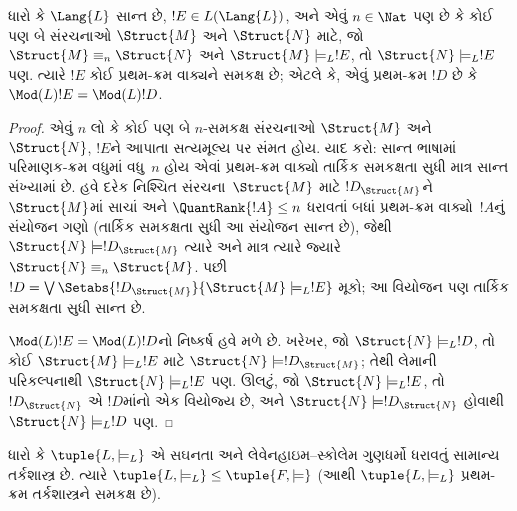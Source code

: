 \label{guunit:OLP-0207}


\begin{lem}
ધારો કે $\Lang{L}$ સાન્ત છે, $!E \in L(\Lang{L})$, અને એવું
$n \in \Nat$ પણ છે કે કોઈ પણ બે સંરચનાઓ $\Struct{M}$ અને
$\Struct{N}$ માટે, જો $\Struct{M} \equiv_n \Struct{N}$ અને
$\Struct{M} \models_L !E$, તો $\Struct{N} \models_L !E$ પણ. ત્યારે
$!E$ કોઈ પ્રથમ-ક્રમ વાક્યને સમકક્ષ છે; એટલે કે, એવું પ્રથમ-ક્રમ
$!D$ છે કે $\Mod(L){!E} = \Mod(L){!D}$.
\end{lem}

\begin{proof}
એવું $n$ લો કે કોઈ પણ બે $n$-સમકક્ષ સંરચનાઓ $\Struct{M}$ અને
$\Struct{N}$, $!E$ને આપાતા સત્યમૂલ્ય પર સંમત હોય.
 યાદ કરો: સાન્ત ભાષામાં
પરિમાણક-ક્રમ વધુમાં વધુ~$n$ હોય એવાં પ્રથમ-ક્રમ વાક્યો તાર્કિક
સમકક્ષતા સુધી માત્ર સાન્ત સંખ્યામાં છે. હવે દરેક નિશ્ચિત
સંરચના~$\Struct{M}$ માટે $!D_{\Struct{M}}$ને $\Struct{M}$માં
સાચાં અને $\QuantRank{!A} \le n$ ધરાવતાં બધાં પ્રથમ-ક્રમ
વાક્યો~$!A$નું સંયોજન ગણો (તાર્કિક સમકક્ષતા સુધી આ સંયોજન
સાન્ત છે), જેથી $\Struct{N} \models !D_{\Struct{M}}$ ત્યારે અને માત્ર
ત્યારે જ્યારે $\Struct{N} \equiv_n \Struct{M}$. પછી
$!D = \textstyle\bigvee
\Setabs{!D_{\Struct{M}}}{\Struct{M} \models_L !E}$ મૂકો; આ વિયોજન પણ
તાર્કિક સમકક્ષતા સુધી સાન્ત છે.

$\Mod(L){!E} = \Mod(L){!D}$નો નિષ્કર્ષ હવે મળે છે. ખરેખર, જો
$\Struct{N} \models_L !D$, તો કોઈ $\Struct{M} \models_L !E$ માટે
$\Struct{N} \models !D_{\Struct{M}}$; તેથી લેમાની પરિકલ્પનાથી
$\Struct{N} \models_L !E$ પણ. ઊલટું, જો $\Struct{N} \models_L !E$,
તો $!D_\Struct{N}$ એ $!D$માંનો એક વિયોજ્ય છે, અને $\Struct{N}
\models !D_\Struct{N}$ હોવાથી $\Struct{N} \models_L !D$ પણ.
\end{proof}

\begin{thm}[લિન્ડસ્ટ્રોમનું પ્રમેય]
   ધારો કે $\tuple{L, \models_L}$ એ સઘનતા અને
  લેવેનહાઇમ--સ્કોલેમ ગુણધર્મો ધરાવતું સામાન્ય તર્કશાસ્ત્ર છે. ત્યારે
  $\tuple{L, \models_L} \le \tuple{F, \models}$ (આથી
  $\tuple{L, \models_L}$ પ્રથમ-ક્રમ તર્કશાસ્ત્રને સમકક્ષ છે).
\end{thm}

